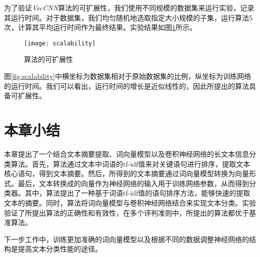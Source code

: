 为了验证\textit{VecCNN}算法的可扩展性，我们使用不同规模的数据集来运行实验，记录其运行时间。对于数据集，我们均匀随机地选取指定大小规模的子集，运行算法5次，计算其平均运行时间作为最终结果。实验结果如图\ref{fig:scalabilityCNN}所示。

\begin{figure}[!htbp]
    \centering
    \texttt{[image: scalability]}
    \caption{算法的可扩展性}
    \label{fig:scalabilityCNN}
\end{figure}

图\ref{fig:scalability}中横坐标为数据集相对于原始数据集的比例，纵坐标为训练网络的运行时间。我们可以看出，运行时间的增长是近似线性的，因此所提出的算法具备可扩展性。
\section{本章小结}
\label{sec3:conclusion}
本章提出了一个结合文本摘要提取、词向量模型以及卷积神经网络的长文本信息分类算法。首先，算法通过文本中词语的tf-idf值来对关键语句进行排序，提取文本核心语句，得到文本摘要。然后，所得到的文本摘要通过词向量模型转换为向量形式。最后，文本转换成的向量作为神经网络的输入用于训练网络参数，从而得到分类器。其中，算法提出了一种基于词语tf-idf值的语句排序方法，能够快速的提取文本的摘要。同时，算法将词向量模型与卷积神经网络结合来实现文本分类。实验验证了所提出算法的正确性和有效性，在多个评判准则中，所提出的算法都优于基准算法。

下一步工作中，训练更加准确的词向量模型以及根据不同的数据调整神经网络的结构是提高文本分类性能的途径。